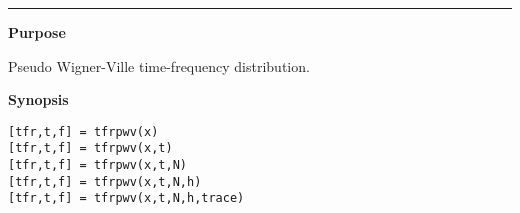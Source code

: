 

\hspace*{-1.6cm}{\Large \bf tfrpwv}

\vspace*{-.4cm}
\hspace*{-1.6cm}\rule[0in]{16.5cm}{.02cm}
\vspace*{.2cm}

{\bf \large {}\selectfont Purpose}\\
\hspace*{1.5cm}
\begin{minipage}[t]{13.5cm}
Pseudo Wigner-Ville time-frequency distribution.
\end{minipage}
\vspace*{.5cm}

{\bf \large {}\selectfont Synopsis}\\
\hspace*{1.5cm}
\begin{minipage}[t]{13.5cm}
\begin{verbatim}
[tfr,t,f] = tfrpwv(x)
[tfr,t,f] = tfrpwv(x,t)
[tfr,t,f] = tfrpwv(x,t,N)
[tfr,t,f] = tfrpwv(x,t,N,h)
[tfr,t,f] = tfrpwv(x,t,N,h,trace)
\end{verbatim}
\end{minipage}
\vspace*{.5cm}

